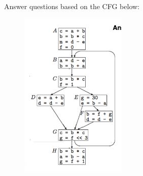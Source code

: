 \documentclass[11pt]{article}
\begin{document}
\section{}

Answer questions based on the CFG below:
\begin{figure}[H]
	\centerline{\includegraphics[width=2in]{figures/hw1_cfg1.png}}
\end{figure}
\end{document}
